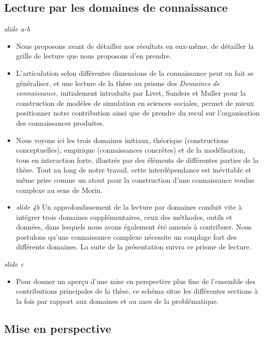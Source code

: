 \documentclass[11pt]{article}
\begin{document}
\subsection*{Lecture par les domaines de connaissance}

\textit{slide a-b}

\begin{itemize}
	\item Nous proposons avant de détailler nos résultats en eux-même, de détailler la grille de lecture que nous proposons d'en prendre.
	\item L'articulation selon différentes dimensions de la connaissance peut en fait se généraliser, et une lecture de la thèse au prisme des \emph{Domaines de connaissance}, initialement introduits par Livet, Sanders et Muller pour la construction de modèles de simulation en sciences sociales, permet de mieux positionner notre contribution ainsi que de prendre du recul sur l'organisation des connaissances produites.
	\item Nous voyons ici les trois domaines initiaux, théorique (constructions conceptuelles), empirique (connaissances concrètes) et de la modélisation, tous en interaction forte, illustrés par des éléments de différentes parties de la thèse. Tout au long de notre travail, cette interdépendance est inévitable et même prise comme un atout pour la construction d'une connaissance voulue complexe au sens de Morin.
	\item \textit{slide 4b} Un approfondissement de la lecture par domaines conduit vite à intégrer trois domaines supplémentaires, ceux des méthodes, outils et données, dans lesquels nous avons également été amenés à contribuer. Nous postulons qu'une connaissance complexe nécessite un couplage fort des différents domaines. La suite de la présentation suivra ce prisme de lecture.
\end{itemize}

\textit{slide c}

\begin{itemize}
	\item  Pour donner un aperçu d'une mise en perspective plus fine de l'ensemble des contributions principales de la thèse, ce schéma situe les différentes sections à la fois par rapport aux domaines et au axes de la problématique.
\end{itemize}




\subsection*{Mise en perspective}
\end{document}

